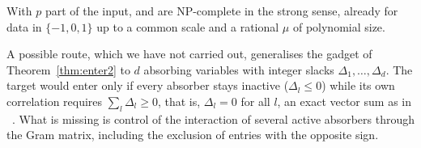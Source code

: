 \begin{conjecture}\label{conj:strong}
With $p$ part of the input,  and  are NP-complete in the strong sense, already for data in $\{-1,0,1\}$ up to a common scale and a rational $\mu$ of polynomial size.
\end{conjecture}
\noindent A possible route, which we have not carried out, generalises the gadget of Theorem~\ref{thm:enter2} to $d$ absorbing variables with integer slacks $\Delta_1,\dots,\Delta_d$. The target would enter only if every absorber stays inactive ($\Delta_l\le0$) while its own correlation requires $\sum_l\Delta_l\ge0$, that is, $\Delta_l=0$ for all $l$, an exact vector sum as in ~\citep{garey1979}. What is missing is control of the interaction of several active absorbers through the Gram matrix, including the exclusion of entries with the opposite sign.

